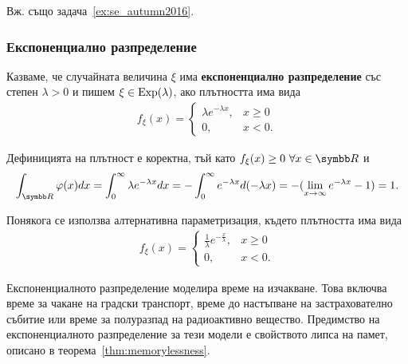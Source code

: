 \documentclass[numbers=endperiod, bibliography=totocnumbered]{scrartcl}
\begin{document}
Вж. също задача~\ref{ex:se_autumn2016}.

\subsubsection{Експоненциално разпределение}\label{dist:exp}

\begin{definition}
  Казваме, че случайната величина \( \xi \) има \textbf{експоненциално разпределение} със степен \( \lambda > 0 \) и пишем \( \xi \in \operatorname{Exp}(\lambda) \), ако плътността има вида
  \begin{align*}
    f_\xi(x) = \begin{cases}
      \lambda e^{-\lambda x}, & x \geq 0 \\
      0, &x < 0.
    \end{cases}
  \end{align*}

  Дефиницията на плътност е коректна, тъй като \( f_\xi(x) \geq 0~\forall x \in \R \) и
  \begin{equation*}
    \int_{\R} \varphi(x) dx
    =
    \int_0^\infty \lambda e^{-\lambda x} dx
    =
    -\int_0^\infty e^{-\lambda x} d(-\lambda x)
    =
    -(\lim_{x \to \infty} e^{-\lambda x} - 1)
    =
    1.
  \end{equation*}

  Понякога се използва алтернативна параметризация, където плътността има вида
  \begin{align*}
    f_\xi(x) = \begin{cases}
      \frac 1 \lambda e^{-\frac x \lambda}, & x \geq 0 \\
      0, &x < 0.
    \end{cases}
  \end{align*}
\end{definition}

Експоненциалното разпределение моделира време на изчакване. Това включва време за чакане на градски транспорт, време до настъпване на застрахователно събитие или време за полуразпад на радиоактивно вещество. Предимство на експоненциалното разпределение за тези модели е свойството липса на памет, описано в теорема~\ref{thm:memorylessness}.
\end{document}
